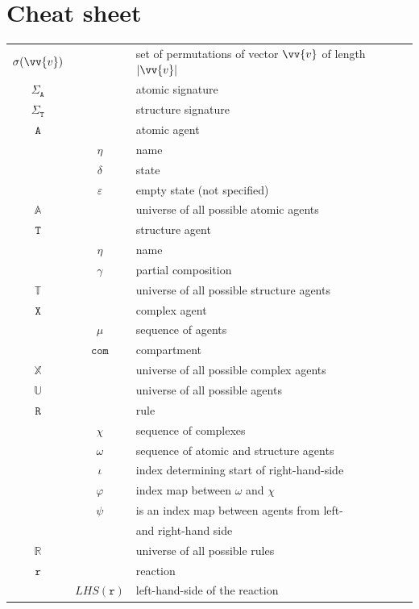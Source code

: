 \documentclass[12pt]{fithesis2}
\begin{document}



\appendix

\chapter{Cheat sheet}

\begin{tabular}{c c | l}
$\sigma(\vv{v})$ & & set of permutations of vector $\vv{v}$ of length $|\vv{v}|$\\
$\Sigma_{\mathtt{A}}$ & & atomic signature \\
$\Sigma_{\mathtt{T}}$ & & structure signature \\
$\mathtt{A}$ & & atomic agent \\
 & $\eta$ & name \\
 & $\delta$ & state \\
 & $\varepsilon$ & empty state (not specified)\\
$\mathds{A}$ & & universe of all possible atomic agents \\
$\mathtt{T}$ & & structure agent \\
 & $\eta$ & name \\
 & $\gamma$ & partial composition\\
$\mathds{T}$ & & universe of all possible structure agents\\
$\mathtt{X}$ & & complex agent\\
 & $\mu$ & sequence of agents\\
 & $\mathtt{com}$ & compartment\\
$\mathds{X}$ & & universe of all possible complex agents\\
$\mathds{U}$ & & universe of all possible agents\\
$\mathtt{R}$ & & rule\\
 & $\chi$ & sequence of complexes\\
 & $\omega$ & sequence of atomic and structure agents\\
 & $\iota$ & index determining start of right-hand-side\\
 & $\varphi$ & index map between $\omega$ and $\chi$\\
 & $\psi$ & is an index map between agents from left-\\
 & & and right-hand side\\
$\mathds{R}$ & & universe of all possible rules\\
$\mathtt{r}$ & & reaction\\
 & $LHS(\mathtt{r})$ & left-hand-side of the reaction\\

\end{tabular}
\end{document}
